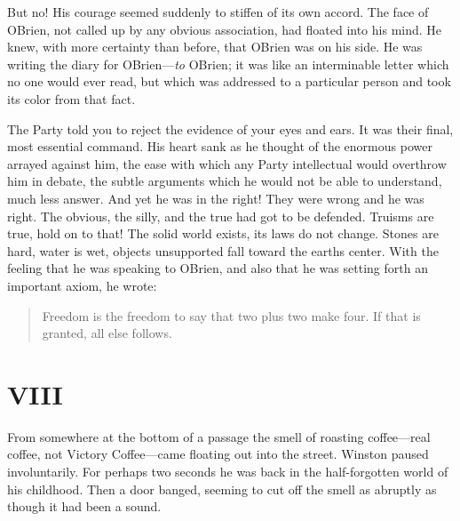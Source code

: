 But no! His courage seemed suddenly to stiffen of its own accord. The
face of O\textquotesingle Brien, not called up by any obvious
association, had floated into his mind. He knew, with more certainty
than before, that O\textquotesingle Brien was on his side. He was
writing the diary for O\textquotesingle Brien---\emph{to}
O\textquotesingle Brien; it was like an interminable letter which no one
would ever read, but which was addressed to a particular person and took
its color from that fact.

The Party told you to reject the evidence of your eyes and ears. It was
their final, most essential command. His heart sank as he thought of the
enormous power arrayed against him, the ease with which any Party
intellectual would overthrow him in debate, the subtle arguments which
he would not be able to understand, much less answer. And yet he was in
the right! They were wrong and he was right. The obvious, the silly, and
the true had got to be defended. Truisms are true, hold on to that! The
solid world exists, its laws do not change. Stones are hard, water is
wet, objects unsupported fall toward the earth\textquotesingle s center.
With the feeling that he was speaking to O\textquotesingle Brien, and
also that he was setting forth an important axiom, he wrote:

\begin{quotation}
Freedom is the freedom to say that two plus two make four. If that
is granted, all else follows.
\end{quotation}


\section{VIII}\label{viii}

From somewhere at the bottom of a passage the smell of roasting
coffee---real coffee, not Victory Coffee---came floating out into the
street. Winston paused involuntarily. For perhaps two seconds he was
back in the half-forgotten world of his childhood. Then a door banged,
seeming to cut off the smell as abruptly as though it had been a sound.

